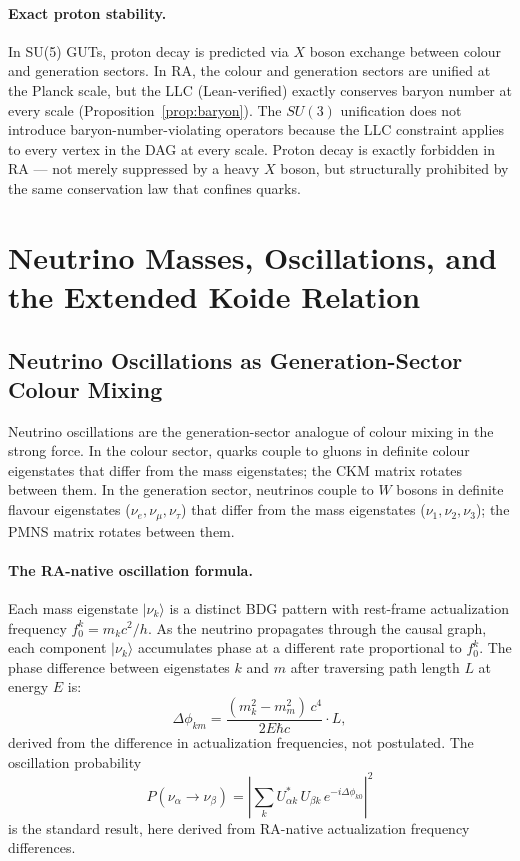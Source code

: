 \documentclass[11pt,a4paper]{article}
\begin{document}
\paragraph{Exact proton stability.}
In SU(5) GUTs, proton decay is predicted via $X$ boson exchange between
colour and generation sectors. In RA, the colour and generation sectors
are unified at the Planck scale, but the LLC (Lean-verified) exactly conserves
baryon number at every scale (Proposition~\ref{prop:baryon}). The $SU(3)$
unification does not introduce baryon-number-violating operators because
the LLC constraint applies to every vertex in the DAG at every scale.
Proton decay is exactly forbidden in RA --- not merely suppressed by a heavy
$X$ boson, but structurally prohibited by the same conservation law that
confines quarks.

\section{Neutrino Masses, Oscillations, and the Extended Koide Relation}
\label{sec:neutrinos}

\subsection{Neutrino Oscillations as Generation-Sector Colour Mixing}

Neutrino oscillations are the generation-sector analogue of colour mixing
in the strong force. In the colour sector, quarks couple to gluons in
definite colour eigenstates that differ from the mass eigenstates; the
CKM matrix rotates between them. In the generation sector, neutrinos couple
to $W$ bosons in definite flavour eigenstates ($\nu_e, \nu_\mu, \nu_\tau$)
that differ from the mass eigenstates ($\nu_1, \nu_2, \nu_3$); the PMNS
matrix rotates between them.

\paragraph{The RA-native oscillation formula.}
Each mass eigenstate $|\nu_k\rangle$ is a distinct BDG pattern with
rest-frame actualization frequency $f_0^k = m_k c^2/h$. As the neutrino
propagates through the causal graph, each component $|\nu_k\rangle$
accumulates phase at a different rate proportional to $f_0^k$. The
phase difference between eigenstates $k$ and $m$ after traversing
path length $L$ at energy $E$ is:
\begin{equation}
  \Delta\phi_{km} = \frac{(m_k^2 - m_m^2)\,c^4}{2E\hbar c} \cdot L,
  \label{eq:osc_phase}
\end{equation}
derived from the difference in actualization frequencies, not postulated.
The oscillation probability
\begin{equation}
  P(\nu_\alpha \to \nu_\beta) = \left|\sum_k U_{\alpha k}^*\,U_{\beta k}\,
  e^{-i\Delta\phi_{k0}}\right|^2
  \label{eq:osc_prob}
\end{equation}
is the standard result, here derived from RA-native actualization frequency
differences.
\end{document}
